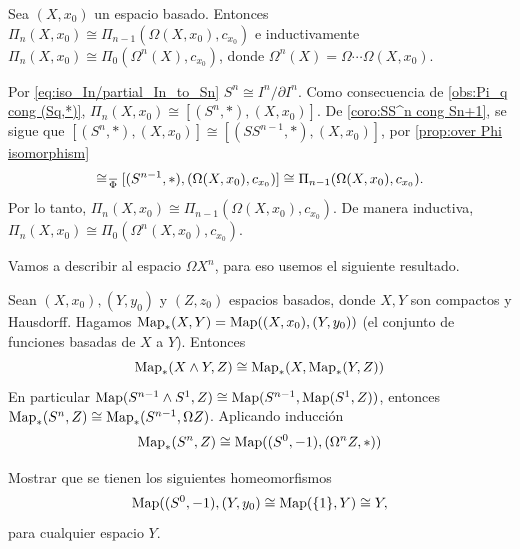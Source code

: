 \begin{coro}
    Sea $(X,x_0)$ un espacio basado. Entonces $\Pi_n(X,x_0)\cong \Pi_{n-1}(\Omega(X,x_0),c_{x_0})$ e inductivamente $\Pi_n(X,x_0)\cong \Pi_0(\Omega^n(X),c_{x_0})$, donde $\Omega^n(X)=\Omega\cdots\Omega(X,x_0).$
\end{coro}

\begin{dem}
    Por \ref{eq:iso_In/partial_In_to_Sn} $S^n\cong I^n/\partial I^n$. Como consecuencia de \ref{obs:Pi_q cong (Sq,*)}, $\Pi_n(X,x_0)\cong[(S^n,*),(X,x_0)]$. De \ref{coro:SS^n cong Sn+1}, se sigue que $[(S^n,*),(X,x_0)]\cong [(SS^{n-1},*),(X,x_0)]$, por \ref{prop:over Phi isomorphism}
    \begin{equation*}
        [(SS^{n-1},*),(X,x_0)]\cong_{\hspace{0.5mm}\overline{\Phi}}[(S^{n-1},*),(\Omega(X,x_0),c_{x_0})]\cong \Pi_{n-1}(\Omega(X,x_0),c_{x_0}).
    \end{equation*}
    Por lo tanto, $\Pi_n(X,x_0)\cong \Pi_{n-1}(\Omega(X,x_0),c_{x_0})$. De manera inductiva, $\Pi_n(X,x_0)\cong \Pi_{0}(\Omega^n(X,x_0),c_{x_0})$.
\end{dem}
Vamos a describir al espacio $\Omega X^n$, para eso usemos el siguiente resultado.
\begin{nota}
     Sean $(X,x_0), (Y,y_0)$ y $(Z,z_0)$ espacios basados, donde $X,Y$ son compactos y Hausdorff. Hagamos $\mathrm{Map}_*(X,Y)=\mathrm{Map}((X,x_0),(Y,y_0))$ (el conjunto de funciones basadas de $X$ a $Y$). Entonces
     \begin{equation*}
         \mathrm{Map}_*(X\wedge Y,Z)\cong\mathrm{Map}_*(X,\mathrm{Map}_*(Y,Z))
     \end{equation*}
     En particular $\mathrm{Map}(S^{n-1}\wedge S^1,Z)\cong \mathrm{Map}(S^{n-1},\mathrm{Map}(S^1,Z))$, entonces $\mathrm{Map}_*(S^n,Z)\cong\mathrm{Map}_*(S^{n-1},\Omega Z)$. Aplicando inducción
     \begin{equation*}
         \mathrm{Map}_*(S^n,Z)\cong \mathrm{Map}((S^0,-1),(\Omega^nZ,*))
     \end{equation*}
\end{nota}
\begin{ejercicio}
    Mostrar que se tienen los siguientes homeomorfismos
    \begin{equation*}
        \mathrm{Map}((S^0,-1),(Y,y_0)\cong \mathrm{Map}(\{1\},Y)\cong Y,
    \end{equation*}
    para cualquier espacio $Y$.
\end{ejercicio}
